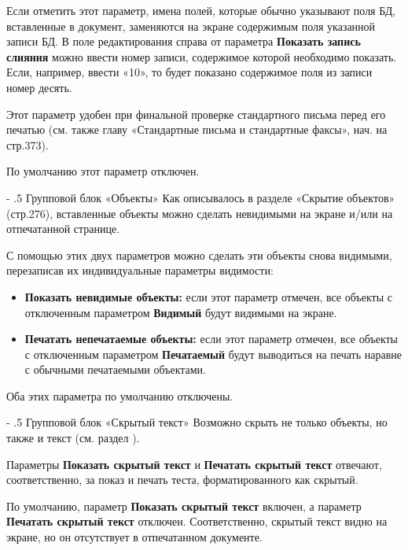 ﻿\documentclass[a4paper,10pt]{article}
\makeatletter
\renewcommand\paragraph{%
   \@startsection{paragraph}{4}{0mm}%
      {-\baselineskip}%
      {.5\baselineskip}%
      {\normalfont\normalsize\bfseries}}
\makeatother
\begin{document}
 Если отметить этот параметр, имена полей, которые обычно указывают поля БД, вставленные в документ, заменяются на экране содержимым поля указанной записи БД. В поле редактирования справа от параметра \textbf{Показать запись слияния} можно ввести номер записи, содержимое которой необходимо показать. Если, например, ввести «10», то будет показано содержимое поля из записи номер десять.
 
 Этот параметр удобен при финальной проверке стандартного письма перед его печатью (см. также главу «Стандартные письма и стандартные факсы», нач. на стр.373).
 
 По умолчанию этот параметр отключен.
 
 \paragraph{Групповой блок «Объекты»}
 Как описывалось в разделе «Скрытие объектов» (стр.276), вставленные объекты можно сделать невидимыми на экране и/или на отпечатанной странице.
 
 С помощью этих двух параметров можно сделать эти объекты снова видимыми, перезаписав их индивидуальные параметры видимости:
 \begin{itemize}
  \item \textbf{Показать невидимые объекты:} если этот параметр отмечен, все объекты с отключенным параметром \textbf{Видимый} будут видимыми на экране.
  \item \textbf{Печатать непечатаемые объекты:} если этот параметр отмечен, все объекты с отключенным параметром \textbf{Печатаемый} будут выводиться на печать наравне с обычными печатаемыми объектами.
 \end{itemize}

 Оба этих параметра по умолчанию отключены.
 
 \paragraph{Групповой блок «Скрытый текст»}
 Возможно скрыть не только объекты, но также и текст (см. раздел ).
 
 Параметры \textbf{Показать скрытый текст} и \textbf{Печатать скрытый текст} отвечают, соответственно, за показ и печать теста, форматированного как скрытый.
 
 По умолчанию, параметр \textbf{Показать скрытый текст} включен, а параметр \textbf{Печатать скрытый текст} отключен. Соответственно, скрытый текст видно на экране, но он отсутствует в отпечатанном документе.
 
\end{document}

